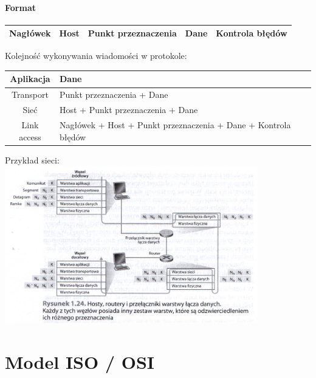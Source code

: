 \documentclass[a4paper,twoside]{article}
\begin{document}
\subsection{Format}
\begin{table}[h]
	\begin{tabular}{|c|c|c|c|c|}
		\hline
		Nagłówek & Host & Punkt przeznaczenia & Dane & Kontrola błędów \\ \hline
	\end{tabular}
\end{table}
Kolejność wykonywania wiadomości w protokole:
\begin{table}[h]
	\begin{tabular}{|c|l|}
		\hline
		Aplikacja	& Dane								\\ \hline
		Transport	& Punkt przeznaczenia + Dane		\\ \hline
		Sieć		& Host + Punkt przeznaczenia + Dane	\\ \hline
		Link access & Nagłówek + Host + Punkt przeznaczenia + Dane + Kontrola błędów \\ \hline
	\end{tabular}
\end{table}
Przykład sieci:\\
\includegraphics[width=11cm]{./images/image01.jpg}

\part{Model ISO / OSI}
\end{document}
